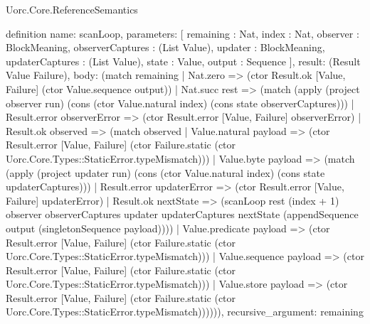 \begin{lexlean}{Uorc.Core.ReferenceSemantics}
\begin{semanticmodule}
definition{
  name: scanLoop,
  parameters: [
    remaining : Nat,
    index : Nat,
    observer : BlockMeaning,
    observerCaptures : (List Value),
    updater : BlockMeaning,
    updaterCaptures : (List Value),
    state : Value,
    output : Sequence
  ],
  result: (Result Value Failure),
  body: (match remaining
    | Nat.zero => (ctor Result.ok [Value, Failure] (ctor Value.sequence output))
    | Nat.succ rest => (match (apply (project observer run) (cons (ctor Value.natural index) (cons state observerCaptures)))
      | Result.error observerError => (ctor Result.error [Value, Failure] observerError)
      | Result.ok observed => (match observed
        | Value.natural payload => (ctor Result.error [Value, Failure] (ctor Failure.static (ctor Uorc.Core.Types::StaticError.typeMismatch)))
        | Value.byte payload => (match (apply (project updater run) (cons (ctor Value.natural index) (cons state updaterCaptures)))
          | Result.error updaterError => (ctor Result.error [Value, Failure] updaterError)
          | Result.ok nextState => (scanLoop rest (index + 1) observer observerCaptures updater updaterCaptures nextState (appendSequence output (singletonSequence payload))))
        | Value.predicate payload => (ctor Result.error [Value, Failure] (ctor Failure.static (ctor Uorc.Core.Types::StaticError.typeMismatch)))
        | Value.sequence payload => (ctor Result.error [Value, Failure] (ctor Failure.static (ctor Uorc.Core.Types::StaticError.typeMismatch)))
        | Value.store payload => (ctor Result.error [Value, Failure] (ctor Failure.static (ctor Uorc.Core.Types::StaticError.typeMismatch)))))),
  recursive_argument: remaining
}


\end{semanticmodule}
\end{lexlean}
